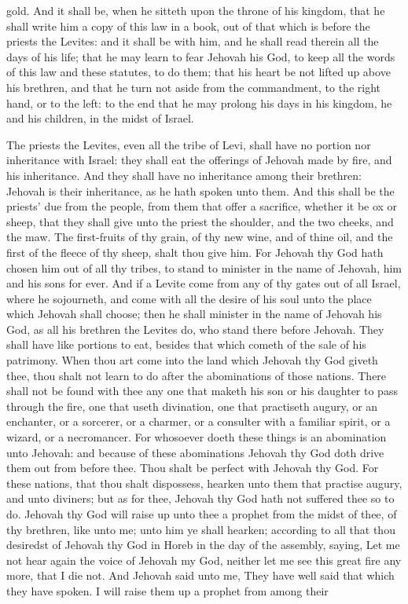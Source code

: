 gold.  And it shall be, when he sitteth upon the throne of his kingdom, that he shall write him a copy of this law in a book, out of that which is before the priests the Levites: and it shall be with him, and he shall read therein all the days of his life; that he may learn to fear Jehovah his God, to keep all the words of this law and these statutes, to do them; that his heart be not lifted up above his brethren, and that he turn not aside from the commandment, to the right hand, or to the left: to the end that he may prolong his days in his kingdom, he and his children, in the midst of Israel. 

The priests the Levites, even all the tribe of Levi, shall have no portion nor inheritance with Israel: they shall eat the offerings of Jehovah made by fire, and his inheritance. And they shall have no inheritance among their brethren: Jehovah is their inheritance, as he hath spoken unto them. And this shall be the priests’ due from the people, from them that offer a sacrifice, whether it be ox or sheep, that they shall give unto the priest the shoulder, and the two cheeks, and the maw. The first-fruits of thy grain, of thy new wine, and of thine oil, and the first of the fleece of thy sheep, shalt thou give him. For Jehovah thy God hath chosen him out of all thy tribes, to stand to minister in the name of Jehovah, him and his sons for ever.  And if a Levite come from any of thy gates out of all Israel, where he sojourneth, and come with all the desire of his soul unto the place which Jehovah shall choose; then he shall minister in the name of Jehovah his God, as all his brethren the Levites do, who stand there before Jehovah. They shall have like portions to eat, besides that which cometh of the sale of his patrimony.  When thou art come into the land which Jehovah thy God giveth thee, thou shalt not learn to do after the abominations of those nations. There shall not be found with thee any one that maketh his son or his daughter to pass through the fire, one that useth divination, one that practiseth augury, or an enchanter, or a sorcerer, or a charmer, or a consulter with a familiar spirit, or a wizard, or a necromancer. For whosoever doeth these things is an abomination unto Jehovah: and because of these abominations Jehovah thy God doth drive them out from before thee. Thou shalt be perfect with Jehovah thy God. For these nations, that thou shalt dispossess, hearken unto them that practise augury, and unto diviners; but as for thee, Jehovah thy God hath not suffered thee so to do.  Jehovah thy God will raise up unto thee a prophet from the midst of thee, of thy brethren, like unto me; unto him ye shall hearken; according to all that thou desiredst of Jehovah thy God in Horeb in the day of the assembly, saying, Let me not hear again the voice of Jehovah my God, neither let me see this great fire any more, that I die not. And Jehovah said unto me, They have well said that which they have spoken. I will raise them up a prophet from among their 